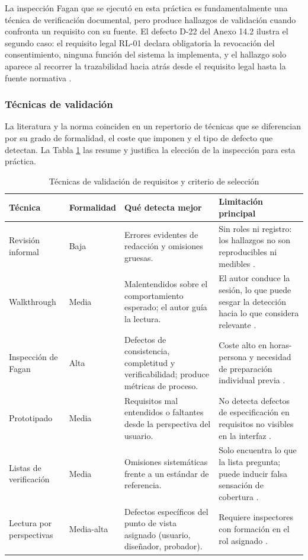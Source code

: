 \documentclass[journal,onecolumn]{IEEEtran}
\begin{document}
	La inspección Fagan que se ejecutó en esta práctica es fundamentalmente una técnica de verificación documental, pero produce hallazgos de validación cuando confronta un requisito con su fuente. El defecto D-22 del Anexo 14.2 ilustra el segundo caso: el requisito legal RL-01 declara obligatoria la revocación del consentimiento, ninguna función del sistema la implementa, y el hallazgo solo aparece al recorrer la trazabilidad hacia atrás desde el requisito legal hasta la fuente normativa \cite{lopdp}.
	
	\subsubsection{Técnicas de validación}
	
	La literatura y la norma coinciden en un repertorio de técnicas que se diferencian por su grado de formalidad, el coste que imponen y el tipo de defecto que detectan. La Tabla \ref{tab:tecnicas-validacion} las resume y justifica la elección de la inspección para esta práctica.
	
	\begin{table}[h]
		\centering
		\caption{Técnicas de validación de requisitos y criterio de selección}
		\label{tab:tecnicas-validacion}
		\begin{tabular}{p{2.4cm}p{1.4cm}p{4cm}p{4.5cm}}
			\toprule
			\textbf{Técnica} & \textbf{Formalidad} & \textbf{Qué detecta mejor} & \textbf{Limitación principal} \\
			\midrule
			Revisión informal & Baja & Errores evidentes de redacción y omisiones gruesas. & Sin roles ni registro: los hallazgos no son reproducibles ni medibles \cite{swebok}. \\
			Walkthrough & Media & Malentendidos sobre el comportamiento esperado; el autor guía la lectura. & El autor conduce la sesión, lo que puede sesgar la detección hacia lo que considera relevante \cite{gilb}. \\
			Inspección de Fagan & Alta & Defectos de consistencia, completitud y verificabilidad; produce métricas de proceso. & Coste alto en horas-persona y necesidad de preparación individual previa \cite{fagan}. \\
			Prototipado & Media & Requisitos mal entendidos o faltantes desde la perspectiva del usuario. & No detecta defectos de especificación en requisitos no visibles en la interfaz \cite{pohl}. \\
			Listas de verificación & Media & Omisiones sistemáticas frente a un estándar de referencia. & Solo encuentra lo que la lista pregunta; puede inducir falsa sensación de cobertura \cite{wiegers}. \\
			Lectura por perspectivas & Media-alta & Defectos específicos del punto de vista asignado (usuario, diseñador, probador). & Requiere inspectores con formación en el rol asignado \cite{pohl}. \\
			\bottomrule
		\end{tabular}
	\end{table}
	
\end{document}
